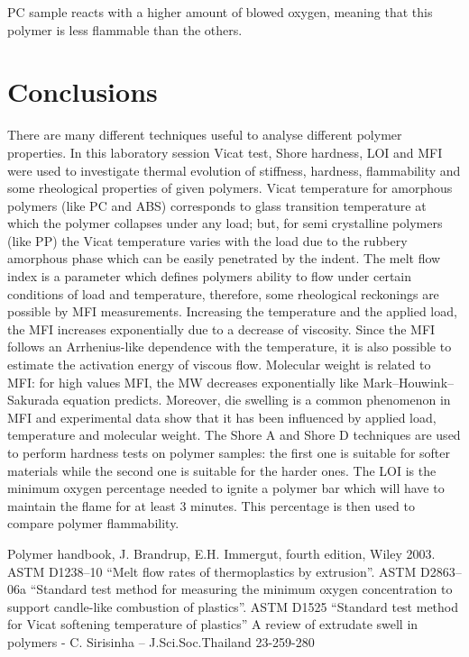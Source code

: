 \documentclass[a4paper, 11pt]{article}
\begin{document}
PC sample reacts with a higher amount of blowed oxygen, meaning that this polymer is less flammable than the others.
 
\section{Conclusions}

There are many different techniques useful to analyse different polymer properties. In this laboratory session Vicat test, Shore hardness, LOI and MFI were used to investigate thermal evolution of stiffness, hardness, flammability and some rheological properties of given polymers.
Vicat temperature for amorphous polymers (like PC and ABS) corresponds to glass transition temperature at which the polymer collapses under any load; but, for semi crystalline polymers (like PP) the Vicat temperature varies with the load due to the rubbery amorphous phase which can be easily penetrated by the indent.
The melt flow index is a parameter which defines polymers ability to flow under certain conditions of load and temperature, therefore, some rheological reckonings are possible by MFI measurements. Increasing the temperature and the applied load, the MFI increases exponentially due to a decrease of viscosity. Since the MFI follows an Arrhenius-like dependence with the temperature, it is also possible to estimate the activation energy of viscous flow. Molecular weight is related to MFI: for high values MFI, the MW decreases exponentially like Mark–Houwink–Sakurada equation predicts. Moreover, die swelling is a common phenomenon in MFI and experimental data show that it has been influenced by applied load, temperature and molecular weight.
The Shore A and Shore D techniques are used to perform hardness tests on polymer samples: the first one is suitable for softer materials while the second one is suitable for the harder ones.
The LOI is the minimum oxygen percentage needed to ignite a polymer bar which will have to maintain the flame for at least 3 minutes. This percentage is then used to compare polymer flammability.

\newpage

\thispagestyle{empty}

\begin{thebibliography}{1}

 Polymer handbook, J. Brandrup, E.H. Immergut, fourth edition, Wiley 2003.
 ASTM D1238–10 “Melt flow rates of thermoplastics by extrusion”. 
 ASTM D2863–06a “Standard test method for measuring the minimum oxygen concentration to support candle-like combustion of plastics”.
 ASTM D1525 “Standard test method for Vicat softening temperature of plastics”
 A review of extrudate swell in polymers - C. Sirisinha – J.Sci.Soc.Thailand 23-259-280

\end{thebibliography}
\end{document}
